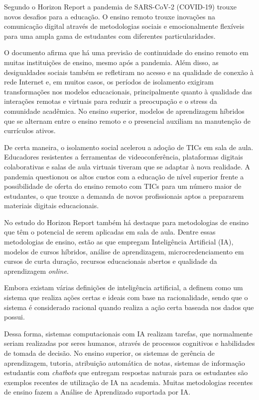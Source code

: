 \documentclass[portuguese]{textolivre}
\begin{document}
Segundo o Horizon Report \cite{pelletier_2021_2021} a pandemia de SARS-CoV-2 (COVID-19) trouxe novos desafios para a educação. O ensino remoto trouxe inovações na comunicação digital através de metodologias sociais e emocionalmente flexíveis para uma ampla gama de estudantes com diferentes particularidades. 

O documento afirma que há uma previsão de continuidade do ensino remoto em muitas instituições de ensino, mesmo após a pandemia. Além disso, as desigualdades sociais também se refletiram no acesso e na qualidade de conexão à rede Internet e, em muitos casos, os períodos de isolamento exigiram transformações nos modelos educacionais, principalmente quanto à qualidade das interações remotas e virtuais para reduzir a preocupação e o stress da comunidade acadêmica. No ensino superior, modelos de aprendizagem híbridos que se alternam entre o ensino remoto e o presencial auxiliam na manutenção de currículos ativos.

De certa maneira, o isolamento social acelerou a adoção de TICs em sala de aula. Educadores resistentes a ferramentas de videoconferência, plataformas digitais colaborativas e salas de aula virtuais tiveram que se adaptar à nova realidade. A pandemia questionou os altos custos com a educação de nível superior frente a possibilidade de oferta do ensino remoto com TICs para um número maior de estudantes, o que trouxe a demanda de novos profissionais aptos a prepararem materiais digitais educacionais.

No estudo do Horizon Report também há destaque para metodologias de ensino que têm o potencial de serem aplicadas em sala de aula. Dentre essas metodologias de ensino, estão as que empregam Inteligência Artificial (IA), modelos de cursos híbridos, análise de aprendizagem, microcredenciamento em cursos de curta duração, recursos educacionais abertos e qualidade da aprendizagem \textit{online}. 

Embora existam várias definições de inteligência artificial, \textcite{russell_artificial_2010} a definem como um sistema que realiza ações certas e ideais com base na racionalidade, sendo que o sistema é considerado racional quando realiza a ação certa baseada nos dados que possui. 

Dessa forma, sistemas computacionais com IA realizam tarefas, que normalmente seriam realizadas por seres humanos, através de processos cognitivos e habilidades de tomada de decisão. No ensino superior, os sistemas de gerência de aprendizagem, tutoria, atribuição automática de notas, sistemas de informação estudantis com \textit{chatbots} que entregam respostas naturais para os estudantes são exemplos recentes de utilização de IA na academia. Muitas metodologias recentes de ensino fazem a Análise de Aprendizado suportada por IA.
\end{document}
